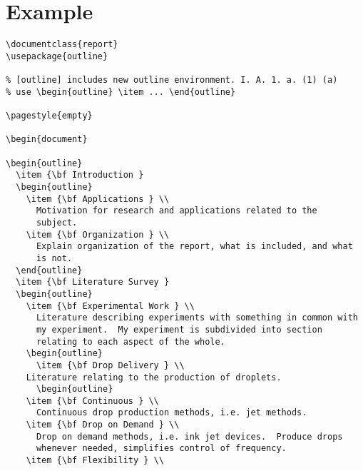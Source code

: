 \documentclass[pagesize=auto, fontsize=12pt, DIV=11]{scrartcl}
\begin{document}
\section{Example}

\begin{lstlisting}
\documentclass{report}
\usepackage{outline}

% [outline] includes new outline environment. I. A. 1. a. (1) (a)
% use \begin{outline} \item ... \end{outline}

\pagestyle{empty}

\begin{document}

\begin{outline}
  \item {\bf Introduction }
  \begin{outline}
    \item {\bf Applications } \\
      Motivation for research and applications related to the
      subject.
    \item {\bf Organization } \\
      Explain organization of the report, what is included, and what
      is not.
  \end{outline}
  \item {\bf Literature Survey }
  \begin{outline}
    \item {\bf Experimental Work } \\
      Literature describing experiments with something in common with
      my experiment.  My experiment is subdivided into section
      relating to each aspect of the whole.
    \begin{outline}
      \item {\bf Drop Delivery } \\
	Literature relating to the production of droplets.
      \begin{outline}
	\item {\bf Continuous } \\
	  Continuous drop production methods, i.e. jet methods.
	\item {\bf Drop on Demand } \\
	  Drop on demand methods, i.e. ink jet devices.  Produce drops
	  whenever needed, simplifies control of frequency.
	\item {\bf Flexibility } \\

\end{lstlisting}
\end{document}
